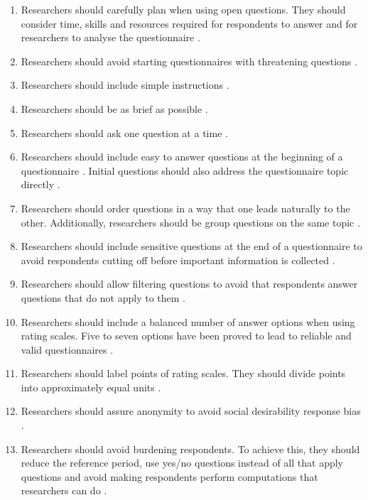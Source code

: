 \begin{enumerate}
    \item Researchers should carefully plan when using open questions. They should consider time, skills and resources required for respondents to answer and for researchers to analyse the questionnaire \cite{Boynton2004c}.
    
    \item Researchers should avoid starting questionnaires with threatening questions \cite{Diem}.
    
    \item Researchers should include simple instructions \cite{Diem}.
    
    \item Researchers should be as brief as possible \cite{Diem}.
    
    \item Researchers should ask one question at a time \cite{Diem,Krosnick2009}.
    
    \item Researchers should include easy to answer questions at the beginning of a questionnaire \cite{Crawford1997,Krosnick2009}. Initial questions should also address the questionnaire topic directly \cite{Krosnick2009}.
    
    \item Researchers should order questions in a way that one leads naturally to the other. Additionally, researchers should be group questions on the same topic \cite{Crawford1997,Krosnick2009}.
    
    \item Researchers should include sensitive questions at the end of a questionnaire to avoid respondents cutting off before important information is collected \cite{Crawford1997,Krosnick2009}.
    
    \item Researchers should allow filtering questions to avoid that respondents answer questions that do not apply to them \cite{Krosnick2009}.
    
    \item Researchers should include a balanced number of answer options when using rating scales. Five to seven options have been proved to lead to reliable and valid questionnaires \cite{Krosnick2009}.
    
    \item Researchers should label points of rating scales. They should divide points into approximately equal units \cite{Krosnick2009}.
    
    \item Researchers should assure anonymity to avoid social desirability response bias \cite{Krosnick2009}.
    
    \item Researchers should avoid burdening respondents. To achieve this, they should reduce the reference period, use yes/no questions instead of all that apply questions and avoid making respondents perform computations that researchers can do \cite{Krosnick2009}.
\end{enumerate}

